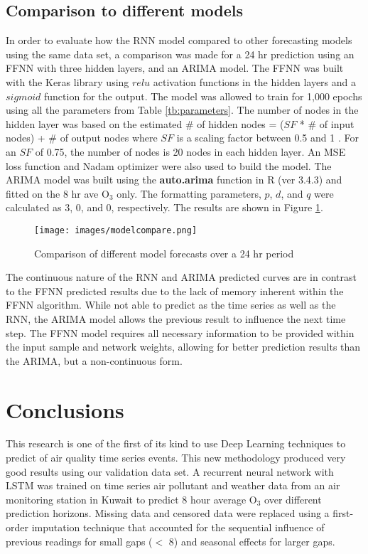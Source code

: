 \subsection{Comparison to different models}

In order to evaluate how the RNN model compared to other forecasting models using the same data set, a comparison was made for a 24 hr prediction using an FFNN with three hidden layers, and an ARIMA model. The FFNN was built with the Keras library using $relu$ activation functions in the hidden layers and a $sigmoid$ function for the output.  The model was allowed to train for 1,000 epochs using all the parameters from Table \ref{tb:parameters}. The number of nodes in the hidden layer was based on the estimated \# of hidden nodes = ($SF$ * \# of input nodes) + \# of output nodes where $SF$ is a scaling factor between 0.5 and 1 \citep{Papaleonidas2013}. For an $SF$ of 0.75, the number of nodes is 20 nodes in each hidden layer. An MSE loss function and Nadam optimizer were also used to build the model. The ARIMA model was built using the \textbf{auto.arima} function in R (ver 3.4.3) \citep{Hyndman2013} and fitted on the 8 hr ave O$_{3}$ only. The formatting parameters, $p$, $d$, and $q$ were calculated as 3, 0, and 0, respectively. The results are shown in Figure \ref{fig:diffmodels}.

%
\begin{figure}[H]
\centering
\texttt{[image: images/modelcompare.png]}
\caption{Comparison of different model forecasts over a 24 hr period}
\label{fig:diffmodels}
\end{figure}
%

The continuous nature of the RNN and ARIMA predicted curves are in contrast to the FFNN predicted results due to the lack of memory inherent within the FFNN algorithm. While not able to predict as the time series as well as the RNN, the ARIMA model allows the previous result to influence the next time step. The FFNN model requires all necessary information to be provided within the input sample and network weights, allowing for better prediction results than the ARIMA, but a non-continuous form. 

\section{Conclusions}
This research is one of the first of its kind to use Deep Learning techniques to predict of air quality time series events. This new methodology produced very good results using our validation data set. A recurrent neural network with LSTM was trained on time series air pollutant and weather data from an air monitoring station in Kuwait to predict 8 hour average O$_{3}$ over different prediction horizons. Missing data and censored data were replaced using a first-order imputation technique that accounted for the sequential influence of previous readings for small gaps ($<$ 8) and seasonal effects for larger gaps. 

